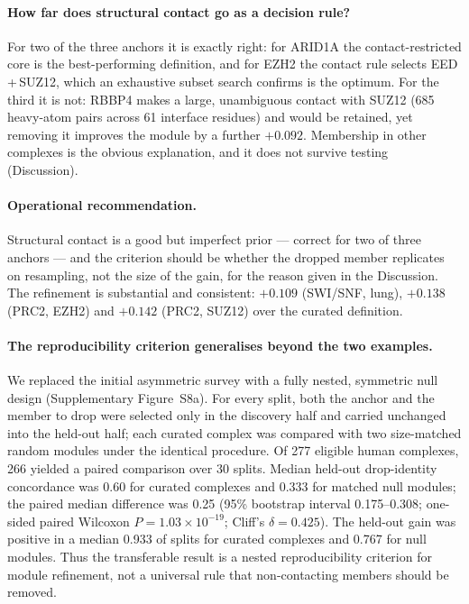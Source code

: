 \documentclass[11pt,a4paper]{article}
\begin{document}
\paragraph{How far does structural contact go as a decision rule?} For two of the
three anchors it is exactly right: for ARID1A the contact-restricted core is the
best-performing definition, and for EZH2 the contact rule selects EED\,+\,SUZ12,
which an exhaustive subset search confirms is the optimum. For the third it is
not: RBBP4 makes a large, unambiguous contact with SUZ12 (685 heavy-atom pairs
across 61 interface residues) and would be retained, yet removing it improves the
module by a further $+0.092$. Membership in other complexes is the obvious
explanation, and it does not survive testing (Discussion).

\paragraph{Operational recommendation.} Structural contact is a good but imperfect
prior --- correct for two of three anchors --- and the criterion should be whether
the dropped member replicates on resampling, not the size of the gain, for the
reason given in the Discussion. The refinement is substantial and consistent:
$+0.109$ (SWI/SNF, lung), $+0.138$ (PRC2, EZH2) and $+0.142$ (PRC2, SUZ12) over
the curated definition.

\paragraph{The reproducibility criterion generalises beyond the two examples.}
We replaced the initial asymmetric survey with a fully nested, symmetric null
design (Supplementary Figure~S8a). For every split, both the anchor and the
member to drop were selected only in the discovery half and carried unchanged
into the held-out half; each curated complex was compared with two
size-matched random modules under the identical procedure. Of 277 eligible
human complexes, 266 yielded a paired comparison over 30 splits. Median held-out
drop-identity concordance was 0.60 for curated complexes and 0.333 for matched
null modules; the paired median difference was 0.25 (95\% bootstrap interval
0.175--0.308; one-sided paired Wilcoxon $P=1.03\times10^{-19}$; Cliff's
$\delta=0.425$). The held-out gain was positive in a median 0.933 of splits for
curated complexes and 0.767 for null modules. Thus the transferable result is a
nested reproducibility criterion for module refinement, not a universal rule
that non-contacting members should be removed.
\end{document}
